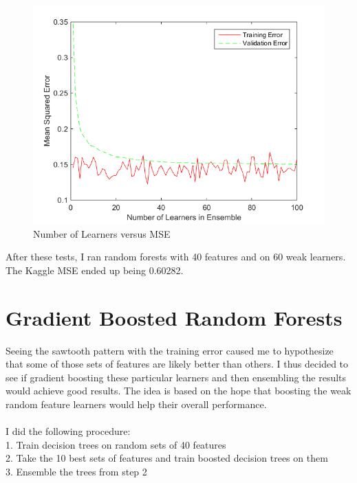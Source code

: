 \documentclass[twoside,11pt]{article}
\theoremstyle{definition}
\begin{document}
\begin{figure}[h!]
\centering
\includegraphics[width=4 in]{numLearnersVersusMSE.png}
\caption{Number of Learners versus MSE}
\end{figure}

After these tests, I ran random forests with 40 features and on 60 weak learners. The Kaggle MSE ended up being 0.60282. 

\section*{Gradient Boosted Random Forests}

Seeing the sawtooth pattern with the training error caused me to hypothesize that some of those sets of features are likely better than others. I thus decided to see if gradient boosting these particular learners and then ensembling the results would achieve good results. The idea is based on the hope that boosting the weak random feature learners would help their overall performance. \\
\\
I did the following procedure:\\
1. Train decision trees on random sets of 40 features\\
2. Take the 10 best sets of features and train boosted decision trees on them\\
3. Ensemble the trees from step 2\\
\end{document}
